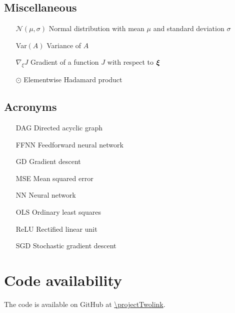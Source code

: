 \subsection*{Miscellaneous}
\begin{enumerate}[leftmargin=4.1em]
    \item[$\mathcal{N}(\mu, \sigma)$]  Normal distribution with mean $\mu$ and standard deviation $\sigma$
    \item[Var$(A)$] Variance of $A$ %
    \item[$\nabla_{\!\xi} J$] Gradient of a function $J$ with respect to $\boldsymbol{\xi}$
    \item[$\odot$] Elementwise Hadamard product 
\end{enumerate}

\subsection*{Acronyms}
\begin{enumerate}[leftmargin=3.3em]
    \item[DAG] Directed acyclic graph
    \item[FFNN] Feedforward neural network
    \item[GD] Gradient descent
    \item[MSE] Mean squared error 
    \item[NN] Neural network 
    \item[OLS] Ordinary least squares 
    \item[ReLU] Rectified linear unit
    \item[SGD] Stochastic gradient descent 
\end{enumerate}








\section*{Code availability}
The code is available on GitHub at \url{\projectTwolink}.







